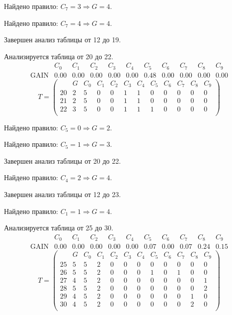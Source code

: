 Найдено правило: $C_{7} = 3 \Longrightarrow G = 4$.

Найдено правило: $C_{7} = 4 \Longrightarrow G = 4$.

Завершен анализ таблицы от 12 до 19.

Анализируется таблица от 20 до 22.
$$ 
\begin{array}{lccccc|c|cccc}
	  & C_{0} & C_{1} & C_{2} & C_{3} & C_{4} & C_{5} & C_{6} & C_{7} & C_{8} & C_{9}\\
 \textrm{GAIN} & 0.00 & 0.00 & 0.00 & 0.00 & 0.00 & 0.48 & 0.00 & 0.00 & 0.00 & 0.00
\end{array}
 $$
$$
T = \left( \begin{array}{lcccccc|c|cccc}
	 & G & C_{0} & C_{1} & C_{2} & C_{3} & C_{4} & C_{5} & C_{6} & C_{7} & C_{8} & C_{9}\\
	20 & 2 & 5 & 0 & 0 & 1 & 1 & 0 & 0 & 0 & 0 & 0\\
	21 & 2 & 5 & 0 & 0 & 1 & 1 & 0 & 0 & 0 & 0 & 0\\
	22 & 3 & 5 & 0 & 0 & 1 & 1 & 1 & 0 & 0 & 0 & 0\\
\end{array} \right)
$$

Найдено правило: $C_{5} = 0 \Longrightarrow G = 2$.

Найдено правило: $C_{5} = 1 \Longrightarrow G = 3$.

Завершен анализ таблицы от 20 до 22.

Найдено правило: $C_{4} = 2 \Longrightarrow G = 4$.

Завершен анализ таблицы от 12 до 23.

Найдено правило: $C_{1} = 1 \Longrightarrow G = 4$.

Анализируется таблица от 25 до 30.
$$ 
\begin{array}{lcccccccc|c|c}
	  & C_{0} & C_{1} & C_{2} & C_{3} & C_{4} & C_{5} & C_{6} & C_{7} & C_{8} & C_{9}\\
 \textrm{GAIN} & 0.00 & 0.00 & 0.00 & 0.00 & 0.00 & 0.07 & 0.00 & 0.07 & 0.24 & 0.15
\end{array}
 $$
$$
T = \left( \begin{array}{lccccccccc|c|c}
	 & G & C_{0} & C_{1} & C_{2} & C_{3} & C_{4} & C_{5} & C_{6} & C_{7} & C_{8} & C_{9}\\
	25 & 5 & 5 & 2 & 0 & 0 & 0 & 0 & 0 & 0 & 0 & 0\\
	26 & 5 & 5 & 2 & 0 & 0 & 0 & 1 & 0 & 1 & 0 & 0\\
	27 & 4 & 5 & 2 & 0 & 0 & 0 & 0 & 0 & 0 & 0 & 1\\
	28 & 5 & 5 & 2 & 0 & 0 & 0 & 0 & 0 & 0 & 0 & 2\\
	29 & 4 & 5 & 2 & 0 & 0 & 0 & 0 & 0 & 0 & 1 & 0\\
	30 & 4 & 5 & 2 & 0 & 0 & 0 & 0 & 0 & 0 & 2 & 0\\
\end{array} \right)
$$

